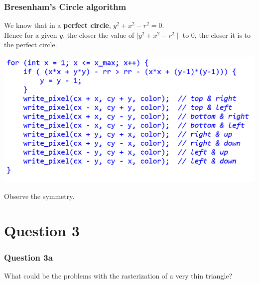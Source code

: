 \documentclass{beamer}
\begin{document}
\begin{frame}
    \frametitle{Bresenham's \textbf{Circle} algorithm}

    We know that in a \textbf{perfect circle}, $y^2 + x^2 - r^2 = 0$.\\

    Hence for a given $y$, the closer the value of $\mid y^2 + x^2 - r^2 \mid$ to 0, 
    the closer it is to the perfect circle.

    \begin{center}
        \includegraphics[scale=0.6]{q2-soln.png}
    \end{center}

    Observe the symmetry.

\end{frame}

\section{Question 3}

\begin{frame}
    \frametitle{Question 3a}
    What could be the problems with the rasterization of a very thin triangle?

\end{frame}
\end{document}
